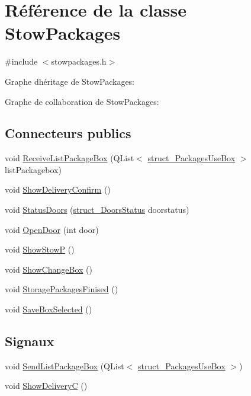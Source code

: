 \hypertarget{class_stow_packages}{}\section{Référence de la classe Stow\+Packages}
\label{class_stow_packages}


{\ttfamily \#include $<$stowpackages.\+h$>$}



Graphe d\textquotesingle{}héritage de Stow\+Packages\+:


Graphe de collaboration de Stow\+Packages\+:
\subsection*{Connecteurs publics}
\begin{DoxyCompactItemize}
\item 
void \hyperlink{class_stow_packages_ad6fbdd35f232cc348c1c6093f5212bff}{Receive\+List\+Package\+Box} (Q\+List$<$ \hyperlink{structstruct___packages_use_box}{struct\+\_\+\+Packages\+Use\+Box} $>$ list\+Packagebox)
\item 
void \hyperlink{class_stow_packages_a7d726aecfa8ee8a34edb2e1267837d70}{Show\+Delivery\+Confirm} ()
\item 
void \hyperlink{class_stow_packages_adb3d59a4fbb1bc05386ee10287b4f809}{Status\+Doors} (\hyperlink{structstruct___doors_status}{struct\+\_\+\+Doors\+Status} doorstatus)
\item 
void \hyperlink{class_stow_packages_adb7562f93d92c610d3614a61fb4b64f8}{Open\+Door} (int door)
\item 
void \hyperlink{class_stow_packages_a2d7a594d9188e8cdaa5b16eb4595710e}{Show\+Stow\+P} ()
\item 
void \hyperlink{class_stow_packages_aaf1a6d23a5db22195ee68015ab2415fa}{Show\+Change\+Box} ()
\item 
void \hyperlink{class_stow_packages_ab23d7a56579f1b972a38bf4403805b44}{Storage\+Packages\+Finised} ()
\item 
void \hyperlink{class_stow_packages_a0c70d2e30981f94630fcdc56716d06ae}{Save\+Box\+Selected} ()
\end{DoxyCompactItemize}
\subsection*{Signaux}
\begin{DoxyCompactItemize}
\item 
void \hyperlink{class_stow_packages_a7399efb7f4bfafd9e7aed65168ece3c9}{Send\+List\+Package\+Box} (Q\+List$<$ \hyperlink{structstruct___packages_use_box}{struct\+\_\+\+Packages\+Use\+Box} $>$)
\item 
void \hyperlink{class_stow_packages_a699ff653b261ed5fc3018d0de5a17e9a}{Show\+Delivery\+C} ()
\end{DoxyCompactItemize}
